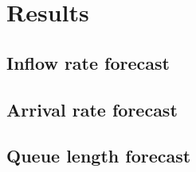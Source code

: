 \chapter{Results}
\label{cha:results}

\section{Inflow rate forecast}
\label{sec:inflow_rate_forecast_results}

\section{Arrival rate forecast}
\label{sec:arrival_rate_forecast_results}

\section{Queue length forecast}
\label{sec:queue_length_forecast_results}

\clearpage
